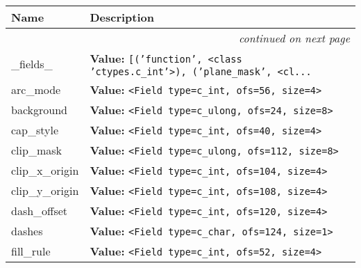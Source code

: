     \vspace{-1cm}
\hspace{\varindent}\begin{longtable}{|p{\varnamewidth}|p{\vardescrwidth}|l}
\cline{1-2}
\cline{1-2} \centering \textbf{Name} & \centering \textbf{Description}& \\
\cline{1-2}
\endhead\cline{1-2}\multicolumn{3}{r}{\small\textit{continued on next page}}\\\endfoot\cline{1-2}
\endlastfoot\raggedright \_\-f\-i\-e\-l\-d\-s\-\_\- & \raggedright \textbf{Value:} 
{\tt \texttt{[}\texttt{(}\texttt{'}\texttt{function}\texttt{'}\texttt{, }{\textless}class 'ctypes.c\_int'{\textgreater}\texttt{)}\texttt{, }\texttt{(}\texttt{'}\texttt{plane\_mask}\texttt{'}\texttt{, }{\textless}cl\texttt{...}}&\\
\cline{1-2}
\raggedright a\-r\-c\-\_\-m\-o\-d\-e\- & \raggedright \textbf{Value:} 
{\tt {\textless}Field type=c\_int, ofs=56, size=4{\textgreater}}&\\
\cline{1-2}
\raggedright b\-a\-c\-k\-g\-r\-o\-u\-n\-d\- & \raggedright \textbf{Value:} 
{\tt {\textless}Field type=c\_ulong, ofs=24, size=8{\textgreater}}&\\
\cline{1-2}
\raggedright c\-a\-p\-\_\-s\-t\-y\-l\-e\- & \raggedright \textbf{Value:} 
{\tt {\textless}Field type=c\_int, ofs=40, size=4{\textgreater}}&\\
\cline{1-2}
\raggedright c\-l\-i\-p\-\_\-m\-a\-s\-k\- & \raggedright \textbf{Value:} 
{\tt {\textless}Field type=c\_ulong, ofs=112, size=8{\textgreater}}&\\
\cline{1-2}
\raggedright c\-l\-i\-p\-\_\-x\-\_\-o\-r\-i\-g\-i\-n\- & \raggedright \textbf{Value:} 
{\tt {\textless}Field type=c\_int, ofs=104, size=4{\textgreater}}&\\
\cline{1-2}
\raggedright c\-l\-i\-p\-\_\-y\-\_\-o\-r\-i\-g\-i\-n\- & \raggedright \textbf{Value:} 
{\tt {\textless}Field type=c\_int, ofs=108, size=4{\textgreater}}&\\
\cline{1-2}
\raggedright d\-a\-s\-h\-\_\-o\-f\-f\-s\-e\-t\- & \raggedright \textbf{Value:} 
{\tt {\textless}Field type=c\_int, ofs=120, size=4{\textgreater}}&\\
\cline{1-2}
\raggedright d\-a\-s\-h\-e\-s\- & \raggedright \textbf{Value:} 
{\tt {\textless}Field type=c\_char, ofs=124, size=1{\textgreater}}&\\
\cline{1-2}
\raggedright f\-i\-l\-l\-\_\-r\-u\-l\-e\- & \raggedright \textbf{Value:} 
{\tt {\textless}Field type=c\_int, ofs=52, size=4{\textgreater}}&\\

\end{longtable}

